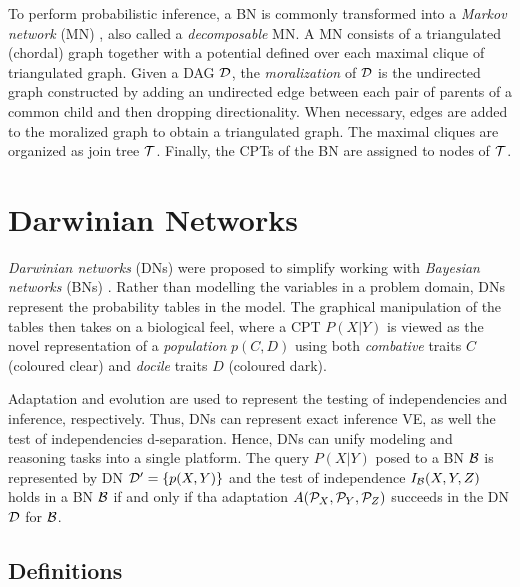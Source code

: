 To perform probabilistic inference, a BN is commonly transformed into a \emph{Markov network} (MN) \cite{pear88}, also called a \emph{decomposable} MN. 
A MN consists of a triangulated (chordal) graph together with a potential defined over each maximal clique of triangulated graph. 
Given a DAG ${\cal D}$, the \emph{moralization} \cite{laur88} of ${\cal D}$ is the undirected graph constructed by adding an undirected edge between each pair of parents of a common child and then dropping directionality.
When necessary, edges are added to the moralized graph to obtain a triangulated graph. 
The maximal cliques are organized as join tree $\cal T$. 
Finally, the CPTs of the BN are assigned to nodes of $\cal T$. 


\clearpage

\section{Darwinian Networks}
\label{sec:darwinian_networks}

\emph{Darwinian networks} (DNs) \cite{butzOliveiraSantosCai15} were proposed to simplify working with \emph{Bayesian networks} (BNs) \cite{pear88}.
Rather than modelling the variables in a problem domain, DNs represent the probability tables in the model.
The graphical manipulation of the tables then takes on a biological feel, where a CPT $P(X|Y)$ is viewed as the novel representation of a \emph{population} $p(C,D)$ using both \emph{combative} traits $C$ (coloured clear) and \emph{docile} traits $D$ (coloured dark).


Adaptation and evolution are used to represent the testing of independencies and inference, respectively.
Thus, DNs can represent exact inference VE, as well the test of independencies d-separation.
Hence, DNs can unify modeling and reasoning tasks into a single platform.
The query $P(X|Y)$ posed to a BN ${\cal B}$ is represented by DN ${\cal D}^{\prime} = \{ p(X,Y) \}$ and the test of independence $I_{\cal{B}}(X,Y,Z)$ holds in a BN $\cal{B}$ if and only if tha adaptation $A({\cal{P}}_X, {\cal{P}}_Y, {\cal{P}}_Z)$ succeeds in the DN $\cal{D}$ for $\cal{B}$.



\subsection{Definitions}
\label{subsec:definitions}


